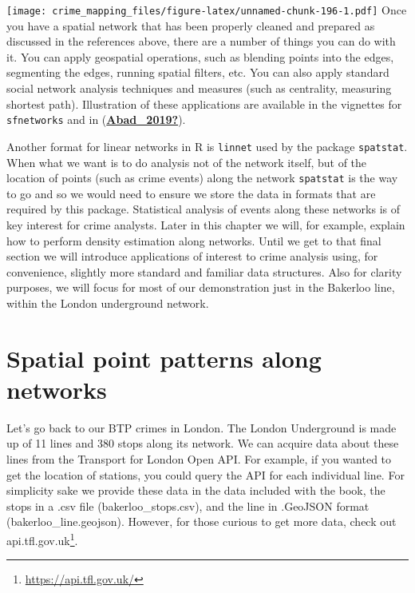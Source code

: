 \documentclass[
  krantz2]{krantz}
\renewcommand{\href}[2]{#2\footnote{\url{#1}}}
\begin{document}
\texttt{[image: crime\_mapping\_files/figure-latex/unnamed-chunk-196-1.pdf]}
Once you have a spatial network that has been properly cleaned and prepared as discussed in the references above, there are a number of things you can do with it. You can apply geospatial operations, such as blending points into the edges, segmenting the edges, running spatial filters, etc. You can also apply standard social network analysis techniques and measures (such as centrality, measuring shortest path). Illustration of these applications are available in the vignettes for \texttt{sfnetworks} and in (\protect\hyperlink{ref-Abad_2019}{\textbf{Abad\_2019?}}).

Another format for linear networks in R is \texttt{linnet} used by the package \texttt{spatstat}. When what we want is to do analysis not of the network itself, but of the location of points (such as crime events) along the network \texttt{spatstat} is the way to go and so we would need to ensure we store the data in formats that are required by this package. Statistical analysis of events along these networks is of key interest for crime analysts. Later in this chapter we will, for example, explain how to perform density estimation along networks. Until we get to that final section we will introduce applications of interest to crime analysis using, for convenience, slightly more standard and familiar data structures. Also for clarity purposes, we will focus for most of our demonstration just in the Bakerloo line, within the London underground network.

\hypertarget{spatial-point-patterns-along-networks}{%
\section{Spatial point patterns along networks}\label{spatial-point-patterns-along-networks}}

Let's go back to our BTP crimes in London. The London Underground is made up of 11 lines and 380 stops along its network. We can acquire data about these lines from the Transport for London Open API. For example, if you wanted to get the location of stations, you could query the API for each individual line. For simplicity sake we provide these data in the data included with the book, the stops in a .csv file (bakerloo\_stops.csv), and the line in .GeoJSON format (bakerloo\_line.geojson). However, for those curious to get more data, check out \href{https://api.tfl.gov.uk/}{api.tfl.gov.uk}.
\end{document}
